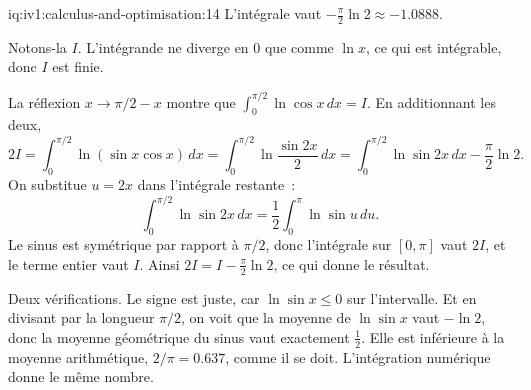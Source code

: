 \begin{solution}{iq:iv1:calculus-and-optimisation:14}
L'intégrale vaut $-\frac{\pi}{2}\ln 2 \approx -1.0888$.

Notons-la $I$. L'intégrande ne diverge en 0 que comme $\ln x$, ce qui est intégrable, donc $I$ est finie.

La réflexion $x \to \pi/2 - x$ montre que $\int_0^{\pi/2}\ln\cos x\,dx = I$. En additionnant les deux,
\[
2I = \int_0^{\pi/2}\ln(\sin x\cos x)\,dx = \int_0^{\pi/2}\ln\frac{\sin 2x}{2}\,dx = \int_0^{\pi/2}\ln\sin 2x\,dx - \frac{\pi}{2}\ln 2.
\]
On substitue $u = 2x$ dans l'intégrale restante~:
\[
\int_0^{\pi/2}\ln\sin 2x\,dx = \frac12\int_0^{\pi}\ln\sin u\,du.
\]
Le sinus est symétrique par rapport à $\pi/2$, donc l'intégrale sur $[0, \pi]$ vaut $2I$, et le terme entier vaut $I$. Ainsi $2I = I - \frac{\pi}{2}\ln 2$, ce qui donne le résultat.

Deux vérifications. Le signe est juste, car $\ln\sin x \le 0$ sur l'intervalle. Et en divisant par la longueur $\pi/2$, on voit que la moyenne de $\ln\sin x$ vaut $-\ln 2$, donc la moyenne géométrique du sinus vaut exactement $\frac12$. Elle est inférieure à la moyenne arithmétique, $2/\pi = 0.637$, comme il se doit. L'intégration numérique donne le même nombre.



\end{solution}

